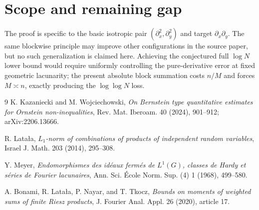 \documentclass[11pt]{article}
\begin{document}
\section{Scope and remaining gap}

The proof is specific to the basic isotropic pair
$(\partial_x^2,\partial_y^2)$ and target $\partial_x\partial_y$.  The same
blockwise principle may improve other configurations in the source paper, but
no such generalization is claimed here.  Achieving the conjectured full
$\log N$ lower bound would require uniformly controlling the pure-derivative
error at fixed geometric lacunarity; the present absolute block summation
costs $n/M$ and forces $M\asymp n$, exactly producing the $\log\log N$ loss.

\begin{thebibliography}{9}
K. Kazaniecki and M. Wojciechowski,
\emph{On Bernstein type quantitative estimates for Ornstein
non-inequalities}, Rev. Mat. Iberoam. 40 (2024), 901--912;
arXiv:2206.13666.

R. Latała,
\emph{$L_1$-norm of combinations of products of independent random
variables}, Israel J. Math. 203 (2014), 295--308.

Y. Meyer,
\emph{Endomorphismes des idéaux fermés de $L^1(G)$, classes de Hardy et
séries de Fourier lacunaires}, Ann. Sci. École Norm. Sup. (4) 1 (1968),
499--580.

A. Bonami, R. Latała, P. Nayar, and T. Tkocz,
\emph{Bounds on moments of weighted sums of finite Riesz products},
J. Fourier Anal. Appl. 26 (2020), article 17.
\end{thebibliography}
\end{document}
